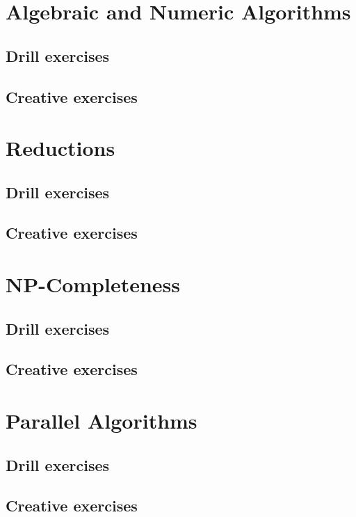 \documentclass[a4paper,11pt]{memoir}
\begin{document}
    \chapter{Algebraic and Numeric Algorithms}
    \section{Drill exercises}
    \section{Creative exercises}

    \chapter{Reductions}
    \section{Drill exercises}
    \section{Creative exercises}

    \chapter{NP-Completeness}
    \section{Drill exercises}
    \section{Creative exercises}
    
    \chapter{Parallel Algorithms}
    \section{Drill exercises}
    \section{Creative exercises}
\end{document}

